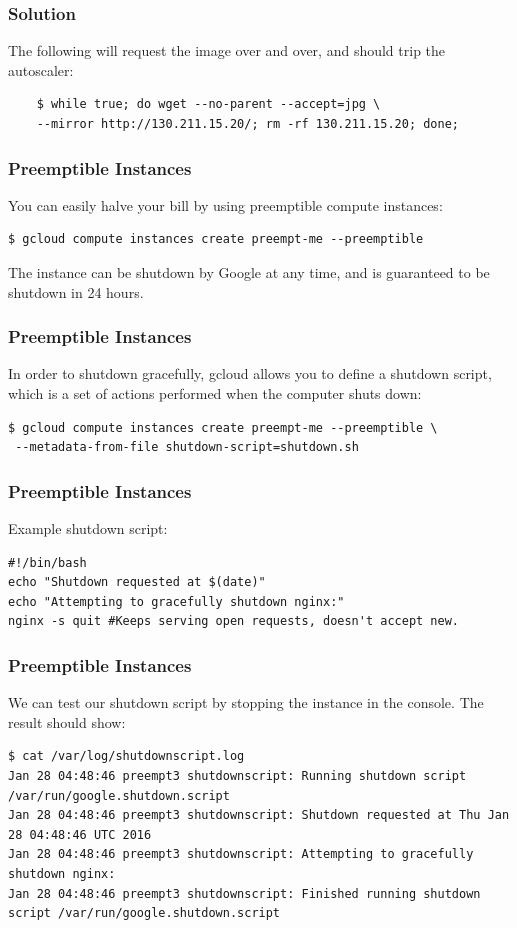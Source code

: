 \documentclass[9pt]{beamer}
\begin{document}
\begin{frame}[fragile]
  \frametitle{Solution}
  The following will request the image over and over, and should trip the autoscaler:
  \begin{verbatim}
    $ while true; do wget --no-parent --accept=jpg \
    --mirror http://130.211.15.20/; rm -rf 130.211.15.20; done;
  \end{verbatim}
\end{frame}

\begin{frame}[fragile]
\frametitle{Preemptible Instances}
You can easily halve your bill by using preemptible compute instances:
\begin{verbatim}
$ gcloud compute instances create preempt-me --preemptible
\end{verbatim}
The instance can be shutdown by Google at any time, and is guaranteed to be shutdown in 24 hours.
\end{frame}

\begin{frame}[fragile]
\frametitle{Preemptible Instances}
In order to shutdown gracefully, gcloud allows you to define a shutdown script, which is a set of actions performed when the computer shuts down:
\begin{verbatim}
$ gcloud compute instances create preempt-me --preemptible \
 --metadata-from-file shutdown-script=shutdown.sh
\end{verbatim}
\end{frame}

\begin{frame}[fragile]
\frametitle{Preemptible Instances}
Example shutdown script:
\begin{verbatim}
#!/bin/bash
echo "Shutdown requested at $(date)"
echo "Attempting to gracefully shutdown nginx:"
nginx -s quit #Keeps serving open requests, doesn't accept new.
\end{verbatim}
\end{frame}

\begin{frame}[fragile]
\frametitle{Preemptible Instances}
We can test our shutdown script by stopping the instance in the console. The result should show:
\begin{verbatim}
$ cat /var/log/shutdownscript.log
Jan 28 04:48:46 preempt3 shutdownscript: Running shutdown script /var/run/google.shutdown.script
Jan 28 04:48:46 preempt3 shutdownscript: Shutdown requested at Thu Jan 28 04:48:46 UTC 2016
Jan 28 04:48:46 preempt3 shutdownscript: Attempting to gracefully shutdown nginx:
Jan 28 04:48:46 preempt3 shutdownscript: Finished running shutdown script /var/run/google.shutdown.script
\end{verbatim}
\end{frame}
\end{document}

